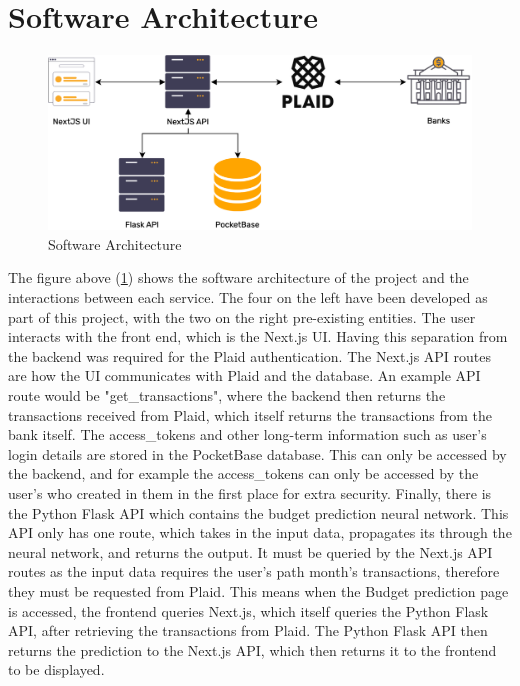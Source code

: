 \section{Software Architecture}

\begin{figure}
	\centering
	\includegraphics[width=\textwidth]{images/Architecture.drawio.png}
	\caption{Software Architecture}
	\label{fig:SoftwareArchitecture}
\end{figure}

The figure above (\ref{fig:SoftwareArchitecture}) shows the software architecture of the project and the interactions between each service. The four on the left have been developed as part of this project, with the two on the right pre-existing entities. The user interacts with the front end, which is the Next.js UI. Having this separation from the backend was required for the Plaid authentication. The Next.js API routes are how the UI communicates with Plaid and the database. An example API route would be "get\_transactions", where the backend then returns the transactions received from Plaid, which itself returns the transactions from the bank itself. The access\_tokens and other long-term information such as user's login details are stored in the PocketBase database. This can only be accessed by the backend, and for example the access\_tokens can only be accessed by the user's who created in them in the first place for extra security. Finally, there is the Python Flask API which contains the budget prediction neural network. This API only has one route, which takes in the input data, propagates its through the neural network, and returns the output. It must be queried by the Next.js API routes as the input data requires the user's path month's transactions, therefore they must be requested from Plaid. This means when the Budget prediction page is accessed, the frontend queries Next.js, which itself queries the Python Flask API, after retrieving the transactions from Plaid. The Python Flask API then returns the prediction to the Next.js API, which then returns it to the frontend to be displayed.

